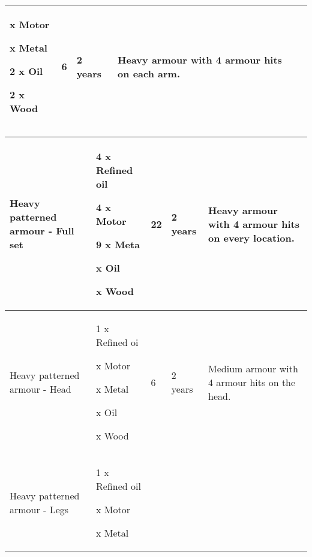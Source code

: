 \documentclass{scrbook}
\begin{document}
\begin{table}
\begin{tabular}{|l|l|l|l|l|}
x Motor

x Metal

2 x Oil\par 2 x Wood & 6 & 2 years & Heavy armour with 4 armour hits on each arm. \\
 \hline \end{tabular}

\end{table}

\begin{table}
\begin{tabular}{|l|l|l|l|l|} \hline 
Heavy patterned armour - Full set & 4 x Refined oil\par 4 x Motor\par 9 x Meta
\setcounter{enumi}{6}

x Oil

x Wood

 & 22 & 2 years & Heavy armour with 4 armour hits on every location. \\
 \hline Heavy patterned armour - Head & 1 x Refined oi

x Motor

x Metal

x Oil

x Wood

 & 6 & 2 years & Medium armour with 4 armour hits on the head. \\
 \hline Heavy patterned armour - Legs & 1 x Refined oil\par

x Motor

x Metal


\end{tabular}
\end{table}
\end{document}
